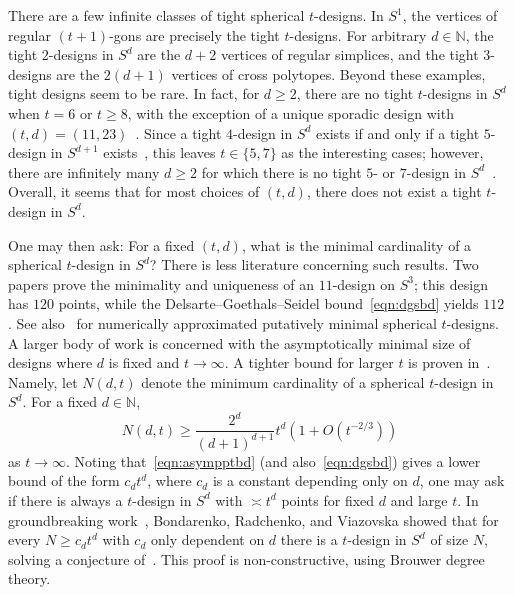 \documentclass[12pt]{article}
\theoremstyle{plain}
\theoremstyle{definition}
\theoremstyle{remark}
\newcommand{\bN}{\mathbb{N}}
\newcommand{\rar}{\rightarrow}
\begin{document}
There are a few infinite classes of tight spherical $t$-designs.
In $S^1$, the vertices of regular $(t+1)$-gons are precisely the tight $t$-designs.
For arbitrary $d \in \bN$, the tight $2$-designs in $S^d$ are the $d+2$ vertices of regular simplices, and the tight $3$-designs are the $2(d+1)$ vertices of cross polytopes.
Beyond these examples, tight designs seem to be rare.
In fact, for $d \geq 2$, there are no tight $t$-designs in $S^d$ when $t=6$ or $t \geq 8$, with the exception of a unique sporadic design with $(t,d) =(11,23)$~\cite{BannaiD:79,BannaiD:80,BannaiS:81}.
Since a tight $4$-design in $S^d$ exists if and only if a tight $5$-design in $S^{d+1}$ exists~\cite{DelsarteGS:77}, this leaves $t \in \{5,7\}$ as the interesting cases; however, there are infinitely many $d \geq 2$ for which there is no tight $5$- or $7$-design in $S^d$~\cite{BannaiMV:05,NebeV:13}.
Overall, it seems that for most choices of $(t,d)$, there does not exist a tight $t$-design in $S^d$.  

One may then ask: For a fixed $(t,d)$, what is the minimal cardinality of a spherical $t$-design in $S^d$?  
There is less literature concerning such results.  
Two papers prove the minimality and uniqueness of an $11$-design on $S^3$; this design has $120$ points, while the Delsarte--Goethals--Seidel bound~\eqref{eqn:dgsbd} yields $112$ \cite{Andreev:00,BoyvalenkovD:01}.
See also~\cite{SloaneHC:03,HardinS:92,Graef:online,Womersley:online,HardinS:96} for numerically approximated putatively minimal spherical $t$-designs.
A larger body of work is concerned with the asymptotically minimal size of designs where $d$ is fixed and $t \rar \infty$.
A tighter bound for larger $t$ is proven in~\cite{Yudin:97}.
Namely, let $N(d,t)$ denote the minimum cardinality of a spherical $t$-design in $S^d$.  
For a fixed $d \in \bN$,
\begin{equation}\label{eqn:asympptbd}
N(d,t) \geq \frac{2^{d}}{(d+1)^{d+1}}t^{d}\left( 1 + O(t^{-2/3})\right)
\end{equation}
as $t \rar \infty$.
Noting that~\eqref{eqn:asympptbd} (and also~\eqref{eqn:dgsbd}) gives a lower bound of the form $c_d t^d$, where $c_d$ is a constant depending only on $d$, one may ask if there is always a $t$-design in $S^d$ with $\asymp t^d$ points for fixed $d$ and large $t$.
In groundbreaking work~\cite{BondarenkoRV:13}, Bondarenko, Radchenko, and Viazovska showed that for every $N \geq c_d t^d$ with $c_d$ only dependent on $d$ there is a $t$-design in $S^d$ of size $N$, solving a conjecture of~\cite{KorevaarM:93}.
This proof is non-constructive, using Brouwer degree theory.
\end{document}
